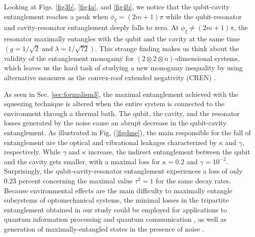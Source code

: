 Looking at Figs. \ref{fig3b}, \ref{fig4a}, and \ref{fig4b}, we notice that the qubit-cavity entanglement reaches a peak when $\phi_{\xi}=(2m+1)\pi$ while the qubit-resonator and cavity-resonator entanglement deeply falls to zero. At $\phi_{\xi}\neq(2m+1)\pi$, the resonator maximally entangles with the qubit and the cavity at the same time $(g=1/\sqrt{2}\; \text{and}\;\lambda=1/\sqrt{72})$. This strange finding makes us think about the validity of the entanglement monogamy for $(2\otimes 2\otimes n)$-dimensional systems, which leaves us the hard task of studying a new monogamy inequality by using alternative measures as the convex-roof extended negativity (CREN) \cite{san2009entanglement}.

As seen in Sec. \ref{sec:formalism3}, the maximal entanglement achieved with the squeezing technique is altered when the entire system is connected to the environment through a thermal 
bath. The qubit, the cavity, and the resonator losses generated by the noise cause an abrupt decrease in the qubit-cavity entanglement. As illustrated in Fig, (\ref{figdme}), the main 
responsible for the fall of entanglement are the optical and vibrational leakages characterized by $\kappa$ and $\gamma$, respectively. While $\gamma$ and $\kappa$ increase, the indirect 
entanglement between the qubit and the cavity gets smaller, with a maximal loss for $\kappa = 0.2$ and $\gamma=10^{-2}$. Surprisingly, the qubit-cavity-resonator entanglement experiences a loss of only $0.23$ percent concerning the maximal value $\tau^{2}=1$ for the same decay rates. Because environmental effects are the main difficulty to maximally entangle subsystems of optomechanical systems, the minimal losses in the tripartite entanglement obtained in our study could be employed for applications to quantum information processing and quantum communication \cite{stannigel2010optomechanical, stannigel2011optomechanical, habraken2012continuous, meher2019proposal, fiaschi2021optomechanical}, as well as generation of maximally-entangled states in the presence of noise \cite{wang2013reservoir, de2022dissipative}. 





